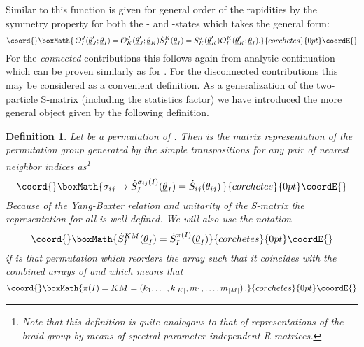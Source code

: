 \documentclass[a4paper,a4paper]{article}
\newtheorem{definition}{Definition}
\begin{document}
Similar to \coordHE{} this function is
given for general order of the rapidities by the symmetry property \coordHE{} for
both the \coordHE{}- and \coordHE{}-states which takes the general form: 
\[\coord{}\boxMath{
\,\mathcal{O}_{I}^{J}(\underline{\theta }_{J}^{\prime };\underline{\theta }%
_{I})=\mathcal{O}_{K}^{J}(\underline{\theta }_{J}^{\prime };\underline{%
\theta }_{K})\dot{S}_{I}^{K}(\underline{\theta }_{I})=\dot{S}_{K}^{J}(%
\underline{\theta }_{K}^{\prime })\mathcal{O}_{I}^{K}(\underline{\theta }%
_{K}^{\prime };\underline{\theta }_{I}). 
}{corchetes}{0pt}\coordE{}\]
For the \emph{connected }contributions this follows again from analytic
continuation \coordHE{} which can be proven similarly as for \coordHE{} \cite{BFKZ}. For the disconnected
contributions this may be considered as a convenient definition. As a
generalization of the two-particle S-matrix (including the statistics
factor) \coordHE{} we have introduced the more
general object \coordHE{} given by the
following definition.

\begin{definition}
Let \coordHE{} be a permutation of \coordHE{}. Then \coordHE{} is the matrix representation of the permutation group \coordHE{} generated by the simple transpositions \coordHE{} for any pair of nearest neighbor indices \coordHE{}
as\footnote{%
Note that this definition is quite analogous to that of representations of
the braid group by means of spectral parameter independent R-matrices.} 
\[\coord{}\boxMath{
\sigma _{ij}\rightarrow \dot{S}_{I}^{\sigma _{ij}(I)}(\underline{\theta }%
_{I})=\dot{S}_{ij}(\theta _{ij})\, 
}{corchetes}{0pt}\coordE{}\]
Because of the Yang-Baxter relation and unitarity of the S-matrix the
representation \coordHE{} for all \coordHE{} is well defined. We will also use the notation 
\[\coord{}\boxMath{
\dot{S}_{I}^{KM}(\underline{\theta }_{I})=\dot{S}_{I}^{\pi (I)}(\underline{%
\theta }_{I}) 
}{corchetes}{0pt}\coordE{}\]
if \myHighlight{$\pi $}\coordHE{} is that permutation which reorders the array \coordHE{} such that it
coincides with the combined arrays of \coordHE{} and \coordHE{} which means that 
\[\coord{}\boxMath{
\pi (I)=KM=(k_{1},\dots ,k_{|K|},m_{1},\dots ,m_{|M|})\,. 
}{corchetes}{0pt}\coordE{}\]
\end{definition}
\end{document}
